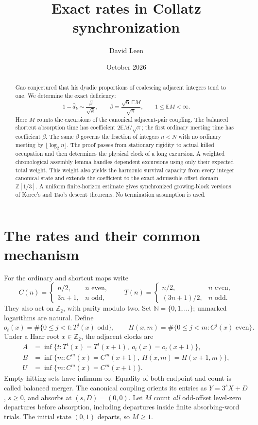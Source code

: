 \documentclass[11pt]{amsart}
\title[Exact rates in Collatz synchronization]{Exact rates in Collatz synchronization}
\author{David Leen}
\date{October 2026}
\theoremstyle{definition}
\theoremstyle{remark}
\newcommand{\N}{\mathbb N}
\newcommand{\Z}{\mathbb Z}
\newcommand{\E}{\mathbb E}
\newcommand{\Ztwo}{\mathbb Z_2}
\begin{document}
\begin{abstract}
Gao conjectured that his dyadic proportions of coalescing adjacent
integers tend to one. We determine the exact deficiency:
\[
1-\bar d_k\sim\frac{\beta}{\sqrt k},\qquad
\beta=\frac{\sqrt6\,\E M}{\sqrt\pi},\qquad 1\le\E M<\infty.
\]
Here $M$ counts the excursions of the canonical adjacent-pair coupling.
The balanced shortcut absorption time has coefficient $2\E M/\sqrt\pi$;
the first ordinary meeting time has coefficient $\beta$. The same
$\beta$ governs the fraction of integers $n<N$ with no ordinary meeting
by $\lfloor\log_2n\rfloor$.
The proof passes from stationary rigidity to actual killed occupation
and then determines the physical clock of a long excursion. A weighted
chronological assembly lemma handles dependent excursions using only
their expected total weight. This weight also yields the harmonic
survival capacity from every integer canonical state and extends the
coefficient to the exact admissible offset domain $\Z[1/3]$.
A uniform finite-horizon estimate gives synchronized growing-block
versions of Korec's and Tao's descent theorems. No termination
assumption is used.
\end{abstract}
\maketitle

\section{The rates and their common mechanism}\label{sec:intro}

For the ordinary and shortcut maps write
\[
C(n)=\begin{cases}n/2,&n\text{ even},\\3n+1,&n\text{ odd},\end{cases}
\qquad
T(n)=\begin{cases}n/2,&n\text{ even},\\(3n+1)/2,&n\text{ odd}.\end{cases}
\]
They also act on $\Ztwo$, with parity modulo two. Set
$\N=\{0,1,\ldots\}$; unmarked logarithms are natural. Define
\[
o_t(x)=\#\{0\le j<t:T^j(x)\text{ odd}\},\qquad
H(x,m)=\#\{0\le j<m:C^j(x)\text{ even}\}.
\]
Under a Haar root $x\in\Ztwo$, the adjacent clocks are
\begin{align*}
A&=\inf\{t:T^t(x)=T^t(x+1),\ o_t(x)=o_t(x+1)\},\\
B&=\inf\{m:C^m(x)=C^m(x+1),\ H(x,m)=H(x+1,m)\},\\
U&=\inf\{m:C^m(x)=C^m(x+1)\}.
\end{align*}
Empty hitting sets have infimum $\infty$. Equality of both endpoint and
count is called balanced merger. The canonical coupling orients its
entries as $Y=3^sX+D$, $s\ge0$, and absorbs at $(s,D)=(0,0)$.
Let $M$ count \emph{all} odd-offset level-zero departures before
absorption, including departures inside finite absorbing-word trials.
The initial state $(0,1)$ departs, so $M\ge1$.
\end{document}
